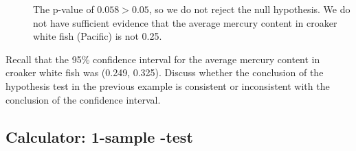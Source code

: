 \begin{examplewrap}
\begin{nexample}
\begin{description}
\item[]  The p-value of $0.058 > 0.05$, so we do not reject the null hypothesis. We do not have sufficient evidence that the average mercury content in croaker white fish (Pacific) is not 0.25.
\end{description}

\end{nexample}
\end{examplewrap}

\begin{exercisewrap}
\begin{nexercise}Recall that the 95\% confidence interval for the average mercury content in croaker white fish was (0.249, 0.325). Discuss whether the conclusion of the hypothesis test in the previous example is consistent or inconsistent with the conclusion of the confidence interval.\footnotemark
\end{nexercise}
\end{exercisewrap}


\D{\newpage}

\subsection[Calculator: 1-sample $t$-test]{Calculator: 1-sample -test}
\label{1SampTtest}

